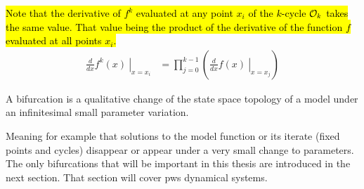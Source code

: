 \hl{
	Note that the derivative of $f^k$ evaluated at any point $x_i$ of the $k$-cycle $\mathcal{O}_k$ takes the same value.
	That value being the product of the derivative of the function $f$ evaluated at all points $x_i$.
}
\begin{align}
	\left. \frac{d}{dx}f^k(x) \:\right|_{x = x_i} & = \prod_{j=0}^{k-1} \left( \left. \frac{d}{dx} f(x) \:\right|_{x = x_j} \right)
\end{align}

\begin{definition}[Bifurcation]
	A bifurcation is a qualitative change of the state space topology of a model under an infinitesimal small parameter variation.
\end{definition}
Meaning for example that solutions to the model function or its iterate (fixed points and cycles) disappear or appear under a very small change to parameters.
The only bifurcations that will be important in this thesis are introduced in the next section.
That section will cover \gls{pws} dynamical systems.
